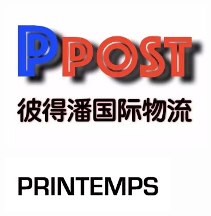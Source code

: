 \documentclass[11pt,fleqn]{book} %
\begin{document}
\begin{center}
\begin{figure}[h]
\begin{subfigure}[t]{0.25\textwidth}
  \end{subfigure}
  \begin{subfigure}[t]{0.25\textwidth}
    \centering\includegraphics[width=\textwidth]{img/ppost.jpg}
  \end{subfigure}
  \begin{subfigure}[t]{0.25\textwidth}
    \centering\includegraphics[width=\textwidth]{img/printemps.jpg}
  \end{subfigure}
\end{figure}
\end{center}
\normalsize





\end{document}
